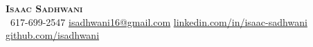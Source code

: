 \begin{center}
    \vspace{2pt}
    \textbf{\Huge \scshape Isaac Sadhwani} \\ \vspace{5pt}
     \ \small 617-699-2547 \quad
    \href{mailto:isadhwani16@gmail.com}{ isadhwani16@gmail.com} \quad
    \href{https://www.linkedin.com/in/}{ linkedin.com/in/isaac-sadhwani} \quad
    \href{https://github.com/isadhwani}{ github.com/isadhwani}
    \vspace{-10pt}

\end{center}